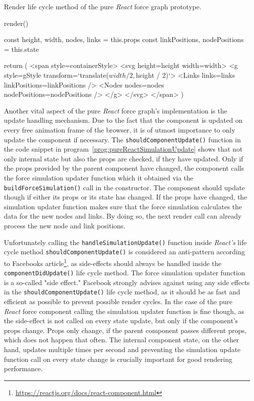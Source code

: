 \begin{program}
\caption{Render life cycle method of the pure \emph{React} force graph prototype.}
\label{prog:pureReactRender}
\begin{JsCode}
render() {
  const { height, width, nodes, links } = this.props
  const { linkPositions, nodePositions } = this.state
  
  return (
    <span style={containerStyle}>
      <svg height={height} width={width}>
        <g style={gStyle} transform={`translate(${width / 2},${height / 2})`}>
          <Links links={links} linkPositions={linkPositions} />
          <Nodes nodes={nodes} nodePositions={nodePositions} />
        </g>
      </svg>
    </span>
  )
}
\end{JsCode}
\end{program}

Another vital aspect of the pure \emph{React} force graph's implementation is the update handling mechanism. Due to the fact that the component is updated on every free animation frame of the browser, it is of utmost importance to only update the component if necessary. The \texttt{shouldComponentUpdate()} function in the code snippet in program~\ref{prog:pureReactSimulationUpdate} shows that not only internal state but also the props are checked, if they have updated. Only if the props provided by the parent component have changed, the component calls the force simulation updater function which it obtained via the \texttt{buildForceSimulation()} call in the constructor. The component should update though if either its props or its state has changed. If the props have changed, the simulation updater function makes sure that the force simulation calculates the data for the new nodes and links. By doing so, the next render call can already process the new node and link positions.

Unfortunately calling the \texttt{handleSimulationUpdate()} function inside \emph{React's} life cycle method \texttt{should\-Component\-Update()} is considered an anti-pattern according to Facebooks article\footnote{\url{https://reactjs.org/docs/react-component.html}}, as side-effects should always be handled inside the \texttt{component\-Did\-Update()} life cycle method. The force simulation updater function is a so-called "side effect." Facebook strongly advises against using any side effects in the \texttt{should\-Component\-Update()} life cycle method, as it should be as fast and efficient as possible to prevent possible render cycles. In the case of the pure \emph{React} force component calling the simulation updater function is fine though, as the side-effect is not called on every state update, but only if the component's props change. Props only change, if the parent component passes different props, which does not happen that often. The internal component state, on the other hand, updates multiple times per second and preventing the simulation update function call on every state change is crucially important for good rendering performance.


